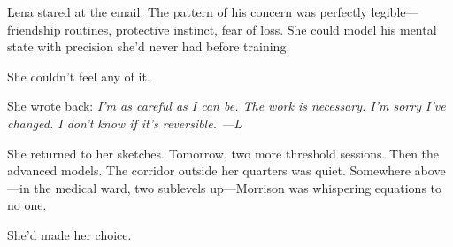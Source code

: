 Lena stared at the email. The pattern of his concern was perfectly legible---friendship routines, protective instinct, fear of loss. She could model his mental state with precision she'd never had before training.

She couldn't feel any of it.

She wrote back: \textit{I'm as careful as I can be. The work is necessary. I'm sorry I've changed. I don't know if it's reversible. ---L}

She returned to her sketches. Tomorrow, two more threshold sessions. Then the advanced models. The corridor outside her quarters was quiet. Somewhere above---in the medical ward, two sublevels up---Morrison was whispering equations to no one.

She'd made her choice.

